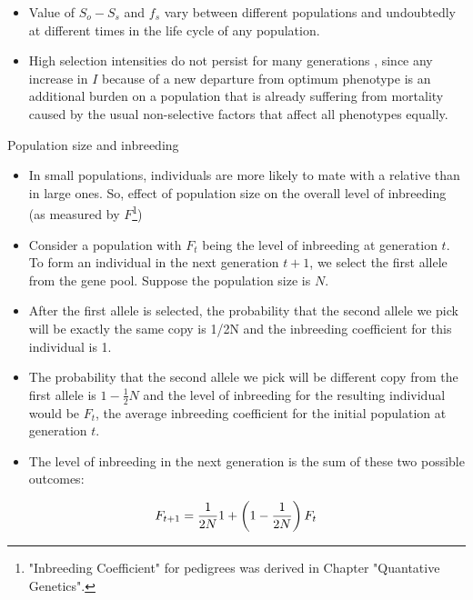 \documentclass[11pt,dvipsnames,ignorenonframetext,aspectratio=169]{beamer}
\providecommand{\tightlist}{%
  \setlength{\itemsep}{0pt}\setlength{\parskip}{0pt}}
\begin{document}
\begin{frame}{}
\protect\hypertarget{section-7}{}
\begin{itemize}
\tightlist
\item
  Value of \(S_o - S_s\) and \(f_s\) vary between different populations
  and undoubtedly at different times in the life cycle of any
  population.
\item
  High selection intensities do not persist for many generations , since
  any increase in \(I\) because of a new departure from optimum
  phenotype is an additional burden on a population that is already
  suffering from mortality caused by the usual non-selective factors
  that affect all phenotypes equally.
\end{itemize}
\end{frame}

\begin{frame}{Population size and inbreeding}
\protect\hypertarget{population-size-and-inbreeding}{}
\footnotesize

\begin{itemize}
\tightlist
\item
  In small populations, individuals are more likely to mate with a
  relative than in large ones. So, effect of population size on the
  overall level of inbreeding (as measured by
  \(F\)\footnote[frame]{"Inbreeding Coefficient" for pedigrees was derived in Chapter "Quantative Genetics".})
\item
  Consider a population with \(F_t\) being the level of inbreeding at
  generation \(t\). To form an individual in the next generation
  \(t + 1\), we select the first allele from the gene pool. Suppose the
  population size is \(N\).
\item
  After the first allele is selected, the probability that the second
  allele we pick will be exactly the same copy is 1/2N and the
  inbreeding coefficient for this individual is 1.
\item
  The probability that the second allele we pick will be different copy
  from the first allele is \(1 - \frac{1}{2}N\) and the level of
  inbreeding for the resulting individual would be \(F_t\), the average
  inbreeding coefficient for the initial population at generation \(t\).
\item
  The level of inbreeding in the next generation is the sum of these two
  possible outcomes:
\end{itemize}

\[
\small
F_{t+1} = \frac{1}{2N}1 + \left(1 - \frac{1}{2N}\right)F_t
\]
\end{frame}
\end{document}
